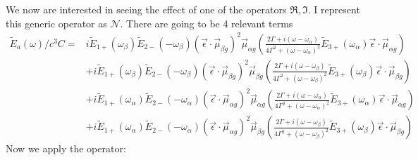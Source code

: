 We now are interested in seeing the effect of one of the operators $\Re, \Im $.  I represent this generic operator as $\mathcal{N}$.  There are going to be 4 relevant terms
\begin{align*}
	\tilde{E}_a (\omega) / c^3 C =& i\tilde{E}_{1+} \left( \omega_{\beta} \right) \tilde{E}_{2-} \left( -\omega_{\beta} \right) \left( \vec{\epsilon} \cdot \vec{\mu}_{\beta g} \right)^2 \vec{\mu}_{\alpha g}   \left( \frac{2 \Gamma + i \left( \omega - \omega_{\alpha}\right)}{4 \Gamma^2 +  \left( \omega - \omega_{\alpha}\right)^2}\tilde{E}_{3+} \left( \omega_{\alpha} \right) \vec{\epsilon} \cdot \vec{\mu}_{\alpha g} \right) \\
	&+ i\tilde{E}_{1+} \left( \omega_{\beta} \right) \tilde{E}_{2-} \left( -\omega_{\beta} \right) \left( \vec{\epsilon} \cdot \vec{\mu}_{\beta g} \right)^2 \vec{\mu}_{\beta g} \left(  \frac{2 \Gamma + i \left( \omega - \omega_{\beta}\right)}{4 \Gamma^2 +  \left( \omega - \omega_{\beta}\right)^2}  \tilde{E}_{3+} \left(  \omega_{\beta} \right) \vec{\epsilon} \cdot \vec{\mu}_{\beta g} \right) \\
	&+ i\tilde{E}_{1+} \left( \omega_{\alpha} \right) \tilde{E}_{2-} \left( -\omega_{\alpha} \right) \left( \vec{\epsilon} \cdot \vec{\mu}_{\alpha g} \right)^2 \vec{\mu}_{\alpha g}   \left( \frac{2 \Gamma + i \left( \omega - \omega_{\alpha}\right)}{4 \Gamma^2 +  \left( \omega - \omega_{\alpha}\right)^2}\tilde{E}_{3+} \left( \omega_{\alpha} \right) \vec{\epsilon} \cdot \vec{\mu}_{\alpha g} \right)\\
	&+i \tilde{E}_{1+} \left( \omega_{\alpha} \right) \tilde{E}_{2-} \left( -\omega_{\alpha} \right) \left( \vec{\epsilon} \cdot \vec{\mu}_{\alpha g} \right)^2 \vec{\mu}_{\beta g} \left(  \frac{2 \Gamma + i \left( \omega - \omega_{\beta}\right)}{4 \Gamma^2 +  \left( \omega - \omega_{\beta}\right)^2}  \tilde{E}_{3+} \left(  \omega_{\beta} \right) \vec{\epsilon} \cdot \vec{\mu}_{\beta g} \right)
\end{align*}
Now we apply the operator:
